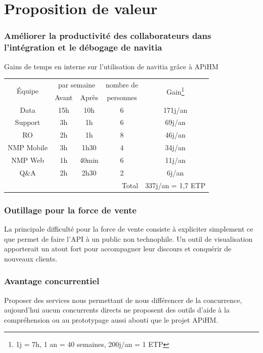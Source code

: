 \documentclass[table]{beamer}
\begin{document}
\section{Proposition de valeur}

\begin{frame}
  \frametitle{Améliorer la productivité des collaborateurs dans
    l'intégration et le débogage de navitia}

  \centering Gains de temps en interne sur l'utilisation de navitia
  grâce à APiHM
  \vfill
  \begin{tabular}{|c|c|c|c|c|}
    \hline
    \multirow{2}{*}{Équipe}& \multicolumn{2}{c|}{par
      semaine}&nombre de&\multirow{2}{*}{Gain\footnote{1j = 7h,
        1 an = 40 semaines, 200j/an = 1 ETP}}\\
    \hhline{~--~~}
    & Avant & Après & personnes &\\
    \hline
    Data       &15h &10h & 6 & 171j/an\\
    Support    & 3h & 1h & 6 &  69j/an\\
    RO         & 2h & 1h & 8 &  46j/an\\
    NMP Mobile & 3h &1h30& 4 &  34j/an\\
    NMP Web    & 1h &40min&6 &  11j/an\\
    Q\&A       & 2h &2h30& 2 &   6j/an\\
    \hline
    \multicolumn{4}{|r|}{Total} &
    337j/an = 1{,}7 ETP\\
    \hline
  \end{tabular}
\end{frame}

\begin{frame}
  \frametitle{Outillage pour la force de vente}

  La principale difficulté pour la force de vente consiste à
  expliciter simplement ce que permet de faire l'API à un public non
  technophile. Un outil de visualisation apporterait un atout fort
  pour accompagner leur discours et conquérir de nouveaux clients.
\end{frame}

\begin{frame}
  \frametitle{Avantage concurrentiel}

  Proposer des services nous permettant de nous différencer de la
  concurrence, aujourd'hui aucun concurrents directs ne proposent des
  outils d'aide à la compréhension ou au prototypage aussi abouti que
  le projet APiHM.
\end{frame}
\end{document}
